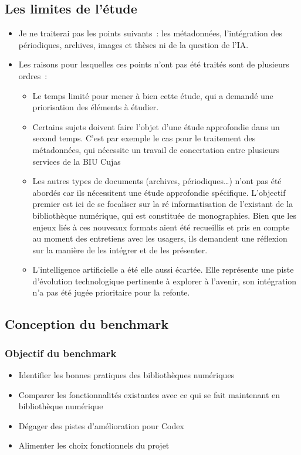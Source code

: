 \subsection{Les limites de l’étude}
\begin{itemize}
	\item Je ne traiterai pas les points suivants : les métadonnées, l’intégration des périodiques, archives, images et thèses ni de la question de l’IA. 
\item Les raisons pour lesquelles ces points n’ont pas été traités sont de plusieurs ordres :
\begin{itemize}
	\item Le temps limité pour mener à bien cette étude, qui a demandé une priorisation des éléments à étudier. 
\item Certains sujets doivent faire l’objet d’une étude approfondie dans un second temps. C’est par exemple le cas pour le traitement des métadonnées, qui nécessite un travail de concertation entre plusieurs services de la BIU Cujas 
\item Les autres types de documents (archives, périodiques…) n’ont pas été abordés car ils nécessitent une étude approfondie spécifique. L'objectif premier est ici de se focaliser sur la ré informatisation de l'existant de la bibliothèque numérique, qui est constituée de monographies. Bien que les enjeux liés à ces nouveaux formats aient été recueillis et pris en compte au moment des entretiens avec les usagers, ils demandent une réflexion sur la manière de les intégrer et de les présenter. 
\item L’intelligence artificielle a été elle aussi écartée. Elle représente une piste d’évolution technologique pertinente à explorer à l’avenir, son intégration n’a pas été jugée prioritaire pour la refonte.
\end{itemize}
\end{itemize}

\subsection{Conception du benchmark}
\subsubsection{Objectif du benchmark}
\begin{itemize}
	\item Identifier les bonnes pratiques des bibliothèques numériques
\item Comparer les fonctionnalités existantes avec ce qui se fait maintenant en bibliothèque numérique
\item Dégager des pistes d’amélioration pour Codex
\item Alimenter les choix fonctionnels du projet
\end{itemize}

